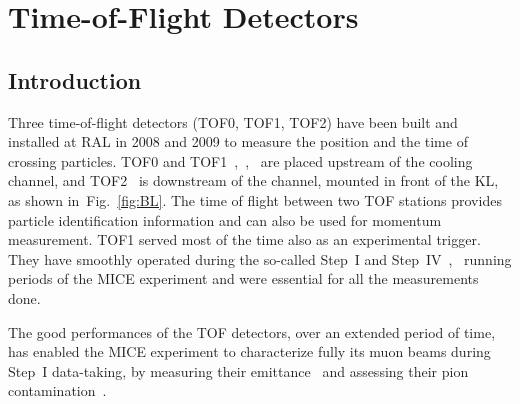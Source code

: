\graphicspath{{02-TOF/Figures/}}

\section{Time-of-Flight Detectors}
\label{Sect:TOF}

\subsection{Introduction}
\label{SubSect:TOF_Intro}

Three time-of-flight detectors (TOF0, TOF1, TOF2) have been built and installed at RAL in 2008 and 2009 to measure the position and the time of crossing particles.
TOF0 and TOF1~\cite{NOTE145},~\cite{NOTE241},~\cite{2010NIMPA.615...14B} are placed upstream of the cooling channel, and TOF2~\cite{NOTE286} is downstream of the channel, mounted in front of the KL, as shown in~Fig.~\ref{fig:BL}.
The time of flight between two TOF stations provides particle identification information and can also be used for momentum measurement. TOF1 served most of the time also as an experimental trigger.
They  have smoothly operated during the so-called Step~I and Step~IV~\cite{Rajaram:2015bra},~\cite{2015ehep.confE.521B} running periods of the MICE experiment and were essential for all the measurements done.

The good performances of the TOF detectors, over an extended period of time,
has enabled the MICE experiment to characterize fully its muon beams during
Step~I data-taking, by measuring their emittance~\cite{2013arXiv1306.1509T} and
assessing their pion contamination~\cite{2016JInst..11P3001A}.

